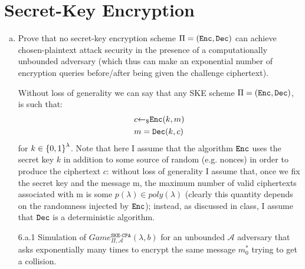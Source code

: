 \section{Secret-Key Encryption}
\begin{enumerate}[(a)]
	\item Prove that no secret-key encryption scheme $\Pi = (\texttt{Enc}, \texttt{Dec})$ can achieve chosen-plaintext attack security in the presence of a computationally unbounded adversary
	(which thus can make an exponential number of encryption queries before/after being	given the challenge ciphertext).
	
	\begin{solution}	
		Without loss of generality we can say that any SKE scheme $\Pi = (\texttt{Enc}, \texttt{Dec})$, is such that:
		\begin{align*}
			&c {\leftarrow_\$} \texttt{Enc}(k, m) \\
			&m = \texttt{Dec}(k, c)
		\end{align*}
		for $k \in {\{0, 1\}}^\lambda$.
		Note that here I assume that the algorithm $\texttt{Enc}$ uses the secret key $k$ in addition to some source of random (e.g. nonces) in order to produce the ciphertext $c$: without loss of generality I assume that, once we fix the secret key and the message m, the maximum number of valid ciphertexts associated with m is some $p(\lambda) \in poly(\lambda)$ (clearly this quantity depends on the randomness injected by $\texttt{Enc}$); instead, as discussed in class, I assume that $\texttt{Dec}$ is a deterministic algorithm.


		\begin{cryptogame}
			{6.a.1}
			{Simulation of $Game_{\Pi, \mathcal{A}}^{\texttt{SKE-CPA}}(\lambda, b)$ for an unbounded $\mathcal{A}$ adversary that asks exponentially many times to encrypt the same message $m_0^*$ trying to get a collision.}
			{}
			{}
			{}
			\cseqdelay
			\cseqbeginloop
			\cseqendloop
			\cseqdelay
		\end{cryptogame}


\end{solution}
\end{enumerate}
